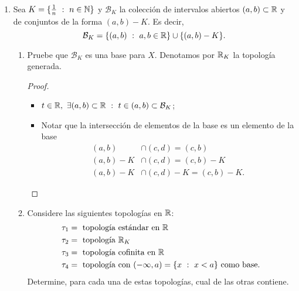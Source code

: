 \documentclass[a4paper]{report}
\begin{document}
\begin{enumerate}
\begin{enumerate}
		\item Determine cuando
		\[
		\tau_3 = \{ U \subset X \ : \ U = X \text{ o } X \setminus U \text{ es infinito} \}
		\]
		es una topología en $X$.
		\begin{proof}~
			Si $p \in X \implies \{ p \}^c$ es infinito $\implies \{ p \}$ es abierto. Si $\tau_3$ es topología y $q \in X$, entonces
			\[
			\bigcup_{p \neq q} \{ p \} = X \setminus \{ q \} \implies (X \setminus \{ q \})^c = \{ q \}
			\]
			es infinito. Contradicción! \textreferencemark \ Es decir, $\tau_3$ no es topología.
		\end{proof}
	\end{enumerate}

	\item Sea $K = \{ \frac{1}{n} \ : \ n \in \mathbb{N} \}$ y $\mathcal{B}_K$ la colección de intervalos abiertos $(a,b) \subset \mathbb{R}$ y de conjuntos de la forma $(a,b) - K$. Es decir,
	\[
	\mathcal{B}_K = \{ (a,b) \ : \ a,b \in \R \} \cup \{ (a,b)-K \}.
	\]
	\begin{enumerate}
		\item Pruebe que $\mathcal{B}_K$ es una base para $X$. Denotamos por $\mathbb{R}_K$ la topología generada.
		\begin{proof}~
			\begin{itemize}
				\item $t \in \R,\ \exists (a,b) \subset \R \ : \ t \in (a,b) \subset \mathcal{B}_K$;

				\item Notar que la intersección de elementos de la base es un elemento de la base
				\begin{align*}
					(a,b) & \cap (c,d)  = (c,b) \\
					(a,b)-K & \cap (c,d)  = (c,b)-K \\
					(a,b)-K & \cap (c,d)-K  = (c,b)-K
				.\end{align*}
			\end{itemize}
		\end{proof}

		\item Considere las siguientes topologías en $\mathbb{R}$:
		\begin{align*}
			\tau_1 & = \text{ topología estándar en } \R \\
			\tau_2 & = \text{ topología } \R_K \\
			\tau_3 & = \text{ topología cofinita en } \R \\
			\tau_4 & = \text{ topología con } (-\infty, a) = \{ x \ : \ x < a \} \text{ como base}  
		.\end{align*}
		Determine, para cada una de estas topologías, cual de las otras contiene.
	\end{enumerate}


\end{enumerate}
\end{document}
